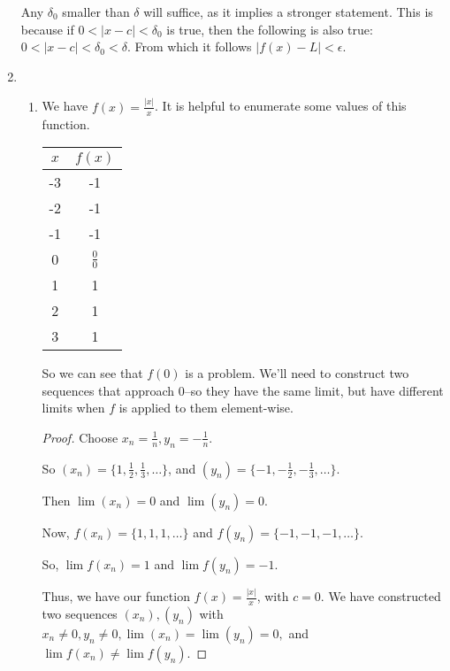 \documentclass[12pt,letterpaper]{article}
\begin{document}
\begin{enumerate}[label=Exercise 4.2.\arabic*]
      Any $\delta_0$ smaller than $\delta$ will suffice, as it implies a stronger statement.
      This is because if $0 < \left|x - c\right| < \delta_0$ is true,
      then the following is also true: $0 < \left|x - c\right| < \delta_0 < \delta$.
      From which it follows $\left|f(x) - L\right| < \epsilon$.

    \item
      \begin{enumerate}
        \item
          We have $f(x) = \frac{\left|x\right|}{x}$.
          It is helpful to enumerate some values of this function.
          \begin{tabular}{c | c}
            $x$ & $f(x)$ \\
            \hline
            -3 & -1 \\
            -2 & -1 \\
            -1 & -1 \\
             0 & $\frac{0}{0}$ \\
             1 & 1 \\
             2 & 1 \\
             3 & 1 \\
          \end{tabular}

          So we can see that $f(0)$ is a problem.
          We'll need to construct two sequences that approach 0--so they have the same limit,
          but have different limits when $f$ is applied to them element-wise.

          \begin{proof}
            Choose $x_n = \frac{1}{n}, y_n = -\frac{1}{n}$.

            So $(x_n) = \{1, \frac{1}{2}, \frac{1}{3}, \dots\}$,
            and $(y_n) = \{-1, -\frac{1}{2}, -\frac{1}{3}, \dots\}$.

            Then $\lim(x_n) = 0$ and $\lim(y_n) = 0$.

            Now, $f(x_n) = \{1, 1, 1, \dots\}$ and $f(y_n) = \{-1, -1, -1, \dots\}$.

            So,  $\lim f(x_n) = 1$ and $\lim f(y_n) = -1$.

            Thus,
            we have our function $f(x) = \frac{\left|x\right|}{x}$,
            with $c = 0$.
            We have constructed two sequences $(x_n), (y_n)$
            with $x_n \ne 0, y_n \ne 0, \lim(x_n) = \lim(y_n) = 0,$
            and $\lim f(x_n) \ne \lim f(y_n)$.


\end{proof}
\end{enumerate}
\end{enumerate}
\end{document}
